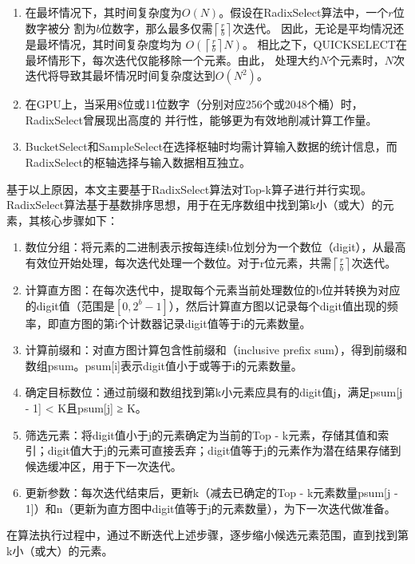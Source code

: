 \begin{enumerate}
\item 在最坏情况下，其时间复杂度为$O(N)$。假设在RadixSelect算法中，一个$r$位数字被分
割为$b$位数字，那么最多仅需$\left\lceil\frac{r}{b}\right\rceil$次迭代。
因此，无论是平均情况还是最坏情况，其时间复杂度均为
$O(\left\lceil\frac{r}{b}\right\rceil N)$。
相比之下，QUICKSELECT在最坏情形下，每次迭代仅能移除一个元素。由此，
处理大约$N$个元素时，$N$次迭代将导致其最坏情况时间复杂度达到$O(N^{2})$。

\item 在GPU上，当采用8位或11位数字（分别对应256个或2048个桶）时，RadixSelect曾展现出高度的
并行性，能够更为有效地削减计算工作量。

\item BucketSelect和SampleSelect在选择枢轴时均需计算输入数据的统计信息，而RadixSelect的枢轴选择与输入数据相互独立。

\end{enumerate}
基于以上原因，本文主要基于RadixSelect算法对Top-k算子进行并行实现。
RadixSelect算法基于基数排序思想，用于在无序数组中找到第k小（或大）的元素，其核心步骤如下：
\begin{enumerate}
    \item {数位分组}：将元素的二进制表示按每连续b位划分为一个数位（digit），从最高有效位开始处理，每次迭代处理一个数位。对于r位元素，共需$\left\lceil\frac{r}{b}\right\rceil$次迭代。
    \item  {计算直方图}：在每次迭代中，提取每个元素当前处理数位的b位并转换为对应的digit值（范围是$[0, 2^{b}-1]$），然后计算直方图以记录每个digit值出现的频率，即直方图的第i个计数器记录digit值等于i的元素数量。
    \item  {计算前缀和}：对直方图计算包含性前缀和（inclusive prefix sum），得到前缀和数组psum。psum[i]表示digit值小于或等于i的元素数量。
    \item  {确定目标数位}：通过前缀和数组找到第k小元素应具有的digit值j，满足psum[j - 1] < K且psum[j] ≥ K。
    \item  {筛选元素}：将digit值小于j的元素确定为当前的Top - k元素，存储其值和索引；digit值大于j的元素可直接丢弃；digit值等于j的元素作为潜在结果存储到候选缓冲区，用于下一次迭代。
    \item  {更新参数}：每次迭代结束后，更新k（减去已确定的Top - k元素数量psum[j - 1]）和n（更新为直方图中digit值等于j的元素数量），为下一次迭代做准备。
\end{enumerate}
在算法执行过程中，通过不断迭代上述步骤，逐步缩小候选元素范围，直到找到第k小（或大）的元素。

